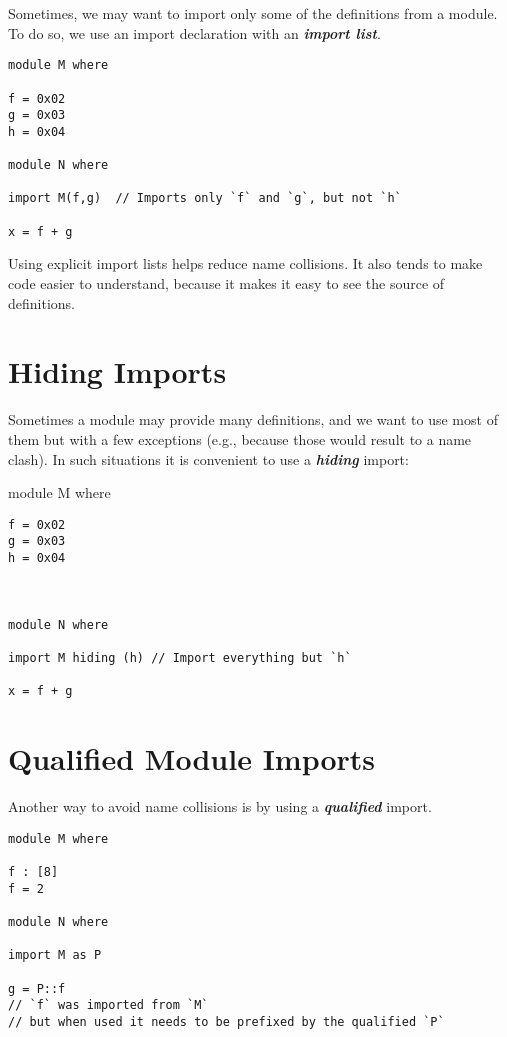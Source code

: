 Sometimes, we may want to import only some of the definitions from a
module. To do so, we use an import declaration with an
\textbf{\emph{import list}}.

\begin{verbatim}
module M where

f = 0x02
g = 0x03
h = 0x04

module N where

import M(f,g)  // Imports only `f` and `g`, but not `h`

x = f + g
\end{verbatim}

Using explicit import lists helps reduce name collisions. It also tends
to make code easier to understand, because it makes it easy to see the
source of definitions.

\hypertarget{hiding-imports}{%
\section{Hiding Imports}\label{hiding-imports}}

Sometimes a module may provide many definitions, and we want to use most
of them but with a few exceptions (e.g., because those would result to a
name clash). In such situations it is convenient to use a
\textbf{\emph{hiding}} import:

module M where

\begin{verbatim}
f = 0x02
g = 0x03
h = 0x04



module N where

import M hiding (h) // Import everything but `h`

x = f + g
\end{verbatim}

\hypertarget{qualified-module-imports}{%
\section{Qualified Module Imports}\label{qualified-module-imports}}

Another way to avoid name collisions is by using a
\textbf{\emph{qualified}} import.

\begin{verbatim}
module M where

f : [8]
f = 2

module N where

import M as P

g = P::f
// `f` was imported from `M`
// but when used it needs to be prefixed by the qualified `P`
\end{verbatim}

